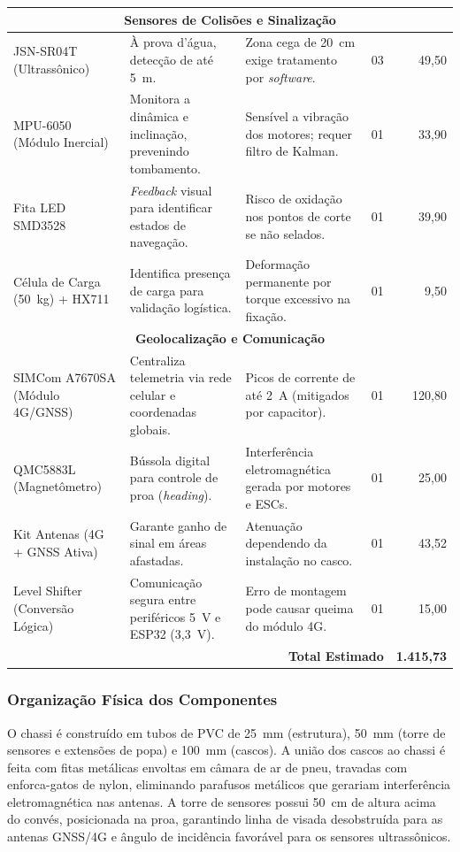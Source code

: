 \documentclass[12pt,a4paper]{article}
\begin{document}
\begin{longtable}{|p{2.8cm}|p{5.0cm}|p{4.0cm}|c|r|}
\multicolumn{5}{|c|}{\textbf{Sensores de Colisões e Sinalização}} \\ \hline
JSN-SR04T (Ultrassônico) & À prova d'água, detecção de até 5~m. & Zona cega de 20~cm exige tratamento por \textit{software}. & 03 & 49,50 \\ \hline
MPU-6050 (Módulo Inercial) & Monitora a dinâmica e inclinação, prevenindo tombamento. & Sensível a vibração dos motores; requer filtro de Kalman. & 01 & 33,90 \\ \hline
Fita LED SMD3528 & \textit{Feedback} visual para identificar estados de navegação. & Risco de oxidação nos pontos de corte se não selados. & 01 & 39,90 \\ \hline
Célula de Carga (50~kg) + HX711 & Identifica presença de carga para validação logística. & Deformação permanente por torque excessivo na fixação. & 01 & 9,50 \\ \hline

\multicolumn{5}{|c|}{\textbf{Geolocalização e Comunicação}} \\ \hline
SIMCom A7670SA (Módulo 4G/GNSS) & Centraliza telemetria via rede celular e coordenadas globais. & Picos de corrente de até 2~A (mitigados por capacitor). & 01 & 120,80 \\ \hline
QMC5883L (Magnetômetro) & Bússola digital para controle de proa (\textit{heading}). & Interferência eletromagnética gerada por motores e ESCs. & 01 & 25,00 \\ \hline
Kit Antenas (4G + GNSS Ativa) & Garante ganho de sinal em áreas afastadas. & Atenuação dependendo da instalação no casco. & 01 & 43,52 \\ \hline
Level Shifter (Conversão Lógica) & Comunicação segura entre periféricos 5~V e ESP32 (3{,}3~V). & Erro de montagem pode causar queima do módulo 4G. & 01 & 15,00 \\ \hline

\hline
\multicolumn{4}{|r|}{\textbf{Total Estimado}} & \textbf{1.415,73} \\

\end{longtable}
\normalsize

\subsubsection{Organização Física dos Componentes}

O chassi é construído em tubos de PVC de 25~mm (estrutura), 50~mm (torre de sensores e extensões de popa) e 100~mm (cascos). A união dos cascos ao chassi é feita com fitas metálicas envoltas em câmara de ar de pneu, travadas com enforca-gatos de nylon, eliminando parafusos metálicos que gerariam interferência eletromagnética nas antenas. A torre de sensores possui 50~cm de altura acima do convés, posicionada na proa, garantindo linha de visada desobstruída para as antenas GNSS/4G e ângulo de incidência favorável para os sensores ultrassônicos.
\end{document}
